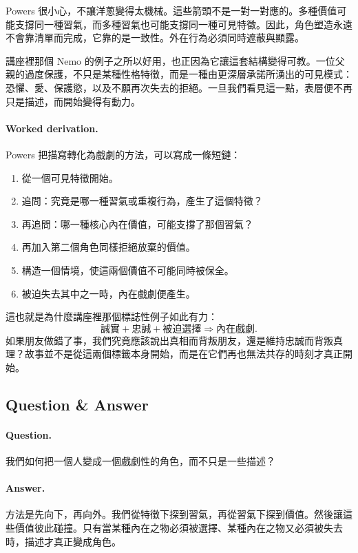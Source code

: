 Powers 很小心，不讓洋蔥變得太機械。這些箭頭不是一對一對應的。多種價值可能支撐同一種習氣，而多種習氣也可能支撐同一種可見特徵。因此，角色塑造永遠不會靠清單而完成，它靠的是一致性。外在行為必須同時遮蔽與顯露。

講座裡那個 Nemo 的例子之所以好用，也正因為它讓這套結構變得可教。一位父親的過度保護，不只是某種性格特徵，而是一種由更深層承諾所湧出的可見模式：恐懼、愛、保護慾，以及不願再次失去的拒絕。一旦我們看見這一點，表層便不再只是描述，而開始變得有動力。

\paragraph{Worked derivation.} Powers 把描寫轉化為戲劇的方法，可以寫成一條短鏈：
\begin{enumerate}
\item 從一個可見特徵開始。
\item 追問：究竟是哪一種習氣或重複行為，產生了這個特徵？
\item 再追問：哪一種核心內在價值，可能支撐了那個習氣？
\item 再加入第二個角色同樣拒絕放棄的價值。
\item 構造一個情境，使這兩個價值不可能同時被保全。
\item 被迫失去其中之一時，內在戲劇便產生。
\end{enumerate}

這也就是為什麼講座裡那個標誌性例子如此有力：
\begin{equation}
\text{誠實} + \text{忠誠} + \text{被迫選擇} \Rightarrow \text{內在戲劇}.
\end{equation}
如果朋友做錯了事，我們究竟應該說出真相而背叛朋友，還是維持忠誠而背叛真理？故事並不是從這兩個標籤本身開始，而是在它們再也無法共存的時刻才真正開始。

\subsection{Question \& Answer}

\paragraph{Question.} 我們如何把一個人變成一個戲劇性的角色，而不只是一些描述？

\paragraph{Answer.} 方法是先向下，再向外。我們從特徵下探到習氣，再從習氣下探到價值。然後讓這些價值彼此碰撞。只有當某種內在之物必須被選擇、某種內在之物又必須被失去時，描述才真正變成角色。

